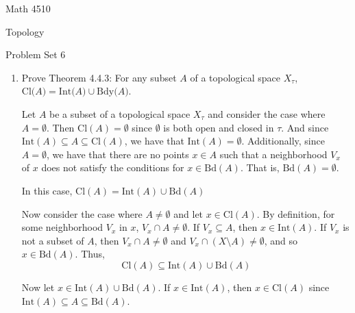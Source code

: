 \documentclass[12pt]{article}
\begin{document}
\noindent Math 4510

\noindent Topology

\vspace{.2in}
\begin{center}
Problem Set 6
\end{center}

 \begin{enumerate}%

\item Prove Theorem 4.4.3: For any subset $A$ of a topological space $X_{\tau}$,\\ $\text{Cl($A$)}=\text{Int($A$)}\cup\text{Bdy($A$)}$. 

Let $A$ be a subset of a topological space $X_{\tau}$ and consider the case where $A = \emptyset$. Then $\text{Cl}(A) = \emptyset$ since $\emptyset$ is both open and closed in $\tau$. And since $\text{Int}(A) \subseteq A \subseteq \text{Cl}(A)$, we have that $\text{Int}(A) = \emptyset$. 
Additionally, since $A = \emptyset$, we have that there are no points $x \in A$ such that a neighborhood $V_x$ of $x$ does not satisfy the conditions for $x \in \text{Bd}(A)$. That is, $\text{Bd}(A) = \emptyset$.

In this case, $\text{Cl}(A) = \text{Int}(A) \cup \text{Bd}(A)$

Now consider the case where $A \neq \emptyset$ and let $x \in \text{Cl}(A)$. By definition, for some neighborhood $V_x$ in $x$, $V_x \cap A \neq \emptyset$. If $V_x \subseteq A$, then $x \in \text{Int}(A)$. If $V_x$ is not a subset of $A$, then $V_x \cap A \neq \emptyset$ and $V_x \cap (X \setminus A) \neq \emptyset$, and so $x \in \text{Bd}(A)$. Thus, 
\[\text{Cl}(A) \subseteq \text{Int}(A) \cup \text{Bd}(A)\]

Now let $x \in \text{Int}(A) \cup \text{Bd}(A)$. If $x \in \text{Int}(A)$, then $x \in \text{Cl}(A)$ since $\text{Int}(A) \subseteq A \subseteq \text{Bd}(A)$.


\end{enumerate}
\end{document}
